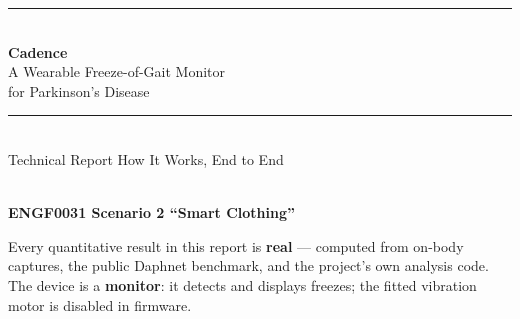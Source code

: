 



\begin{titlepage}
\thispagestyle{empty}
\centering
\vspace*{1.6cm}

{\color{navy}\rule{\linewidth}{2.4pt}}\\[0.5cm]
{\fontsize{52}{56}\selectfont\bfseries\color{navy} Cadence}\\[0.35cm]
{\LARGE\color{steel} A Wearable Freeze-of-Gait Monitor\\[2pt] for Parkinson's Disease}\\[0.5cm]
{\color{navy}\rule{\linewidth}{2.4pt}}\\[0.9cm]

{\Large\color{ink} Technical Report \;\textbullet\; How It Works, End to End}\\[1.4cm]

\\[1.4cm]

\vspace{1.0cm}
{\large\color{ink}\bfseries ENGF0031 Scenario 2 \;\textbullet\; ``Smart Clothing''}\\[0.5cm]
\begin{minipage}{0.82\linewidth}
\centering\small\color{mute}
Every quantitative result in this report is \textbf{real} --- computed from on-body
captures, the public Daphnet benchmark, and the project's own analysis code.
The device is a \textbf{monitor}: it detects and displays freezes; the fitted
vibration motor is disabled in firmware.
\end{minipage}\\[1.2cm]
\end{titlepage}

